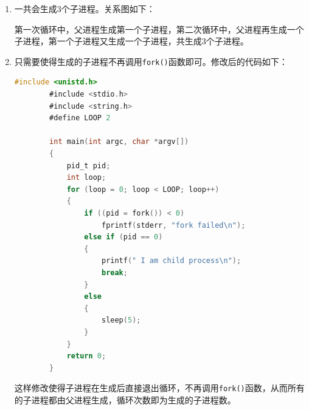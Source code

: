 \documentclass[UTF8]{article}
\begin{document}
\begin{enumerate}[label=(\arabic*)]
    \item 一共会生成3个子进程。关系图如下：
    

    第一次循环中，父进程生成第一个子进程，第二次循环中，父进程再生成一个子进程，第一个子进程又生成一个子进程，共生成3个子进程。

    \item 只需要使得生成的子进程不再调用\texttt{fork()}函数即可。修改后的代码如下：
    
    \begin{lstlisting}[language=C]
        #include <unistd.h>
        #include <stdio.h>
        #include <string.h>
        #define LOOP 2

        int main(int argc, char *argv[])
        {
            pid_t pid;
            int loop;
            for (loop = 0; loop < LOOP; loop++)
            {
                if ((pid = fork()) < 0)
                    fprintf(stderr, "fork failed\n");
                else if (pid == 0)
                {
                    printf(" I am child process\n");
                    break;
                }
                else
                {
                    sleep(5);
                }
            }
            return 0;
        }
    \end{lstlisting}

    这样修改使得子进程在生成后直接退出循环，不再调用\texttt{fork()}函数，从而所有的子进程都由父进程生成，循环次数即为生成的子进程数。
\end{enumerate}
\end{document}
